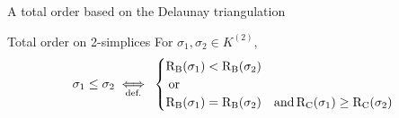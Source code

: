 \begin{frame}[c]{A total order based on the Delaunay triangulation}
	\vspace{0.5cm}
	
	\begin{block}{Total order on 2-simplices}
		For $\sigma_1, \sigma_2 \in K^{(2)}$,
		\[
		\sigma_1 \leq \sigma_2 \underset{\text{def.}}{\iff} \:
		\begin{cases}
			\operatorname{R_B}(\sigma_1) < \operatorname{R_B}(\sigma_2) &\\
			\:  \operatorname{or} &\\
			\operatorname{R_B}(\sigma_1) = \operatorname{R_B}(\sigma_2) & \operatorname{and} \operatorname{R_C}(\sigma_1) \geq \operatorname{R_C}(\sigma_2)
		\end{cases}
		\]
	\end{block}
\end{frame}

%		
%	

%	
%
%
%	

